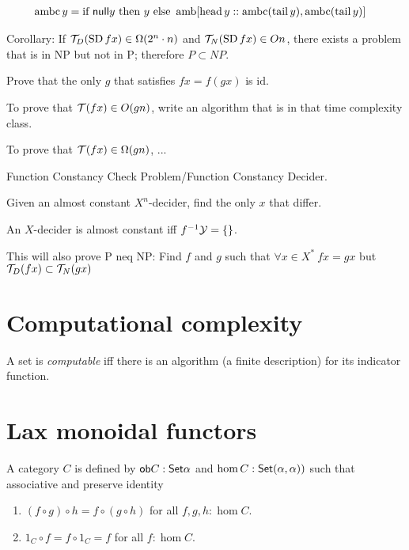     \begin{align}
        \operatorname{ambc} y &= \text{if}~\textsf{null} y~\text{then}~y~\text{else}~\operatorname{amb}[\operatorname{head} y :: \operatorname{ambc} (\operatorname{tail} y), \operatorname{ambc} (\operatorname{tail} y)]
    \end{align}

\begin{mcon}
Corollary:
If $\mathcal{T}_D(\operatorname{SD} fx) \in \Omega(2^n \cdot n)$ and $\mathcal{T}_N(\operatorname{SD} fx) \in O n$,
there exists a problem that is in NP but not in P;
therefore $P \subset NP$.
\end{mcon}

Prove that the only $g$ that satisfies $fx = f(gx)$ is $\text{id}$.

To prove that $\mathcal{T} (fx) \in O(gn)$,
write an algorithm that is in that time complexity class.

To prove that $\mathcal{T} (fx) \in \Omega(gn)$, ...


Function Constancy Check Problem/Function Constancy Decider.

Given an almost constant $X^n$-decider, find the only $x$ that differ.

An $X$-decider is almost constant iff $f^{-1}\mathcal Y = \{\}$.

This will also prove P neq NP:
Find $f$ and $g$ such that $\forall x \in X^* ~ fx = gx$ but $\mathcal{T}_D(fx) \subset \mathcal{T}_N(gx)$









\section{Computational complexity}

A set is \emph{computable} iff there is an algorithm (a finite description)
for its indicator function.

\section{Lax monoidal functors}

A category $C$ is defined by $\textsf{ob} C : \textsf{Set}\alpha$ and $\hom C : \textsf{Set}(\alpha, \alpha))$ such that
associative and preserve identity
\begin{enumerate}
    \item $(f \circ g) \circ h = f \circ (g \circ h)$ for all $f,g,h : \hom C$.
    \item $1_C \circ f = f \circ 1_C = f$ for all $f : \hom C$.
\end{enumerate}


